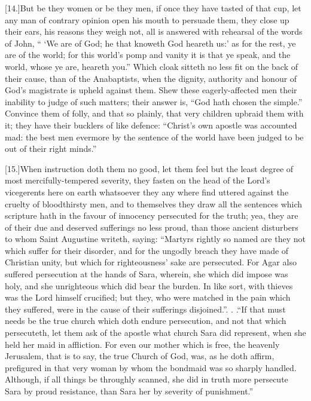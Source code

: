 [14.]But be they women or be they men, if once they have tasted of that cup, let any man of contrary opinion open his mouth to persuade them, they close up their ears, his reasons they weigh not, all is answered with rehearsal of the words of John, “ ‘We are of God; he that knoweth God heareth us:’ as for the rest, ye are of the world; for this world’s pomp and vanity it is that ye speak, and the world, whose ye are, heareth you.” Which cloak sitteth no less fit on the back of their cause, than of the Anabaptists, when the dignity, authority and honour of God’s magistrate is upheld against them. Shew these eagerly-affected men their inability to judge of such matters; their answer is, “God hath chosen the simple.” Convince them of folly, and that so plainly, that very children upbraid them with it; they have their bucklers of like defence: “Christ’s own apostle was accounted mad: the best men evermore by the sentence of the world have been judged to be out of their right minds.”

[15.]When instruction doth them no good, let them feel but the least degree of most mercifully-tempered severity, they fasten on the head of the Lord’s vicegerents here on earth whatsoever they any where find uttered against the cruelty of bloodthirsty men, and to themselves they draw all the sentences which scripture hath in the favour of innocency persecuted for the truth; yea, they are of their due and deserved sufferings no less proud, than those ancient disturbers to whom Saint Augustine writeth, saying: “Martyrs rightly so named are they not which suffer for their disorder, and for the ungodly breach they have made of Christian unity, but which for righteousness’ sake are persecuted. For Agar also suffered persecution at the hands of Sara, wherein, she which did impose was holy, and she unrighteous which did bear the burden. In like sort, with thieves was the Lord himself crucified; but they, who were matched in the pain which they suffered, were in the cause of their sufferings disjoined.”. . .“If that must needs be the true church which doth endure persecution,  and not that which persecuteth, let them ask of the apostle what church Sara did represent, when she held her maid in affliction. For even our mother which is free, the heavenly Jerusalem, that is to say, the true Church of God, was, as he doth affirm, prefigured in that very woman by whom the bondmaid was so sharply handled. Although, if all things be throughly scanned, she did in truth more persecute Sara by proud resistance, than Sara her by severity of punishment.”

